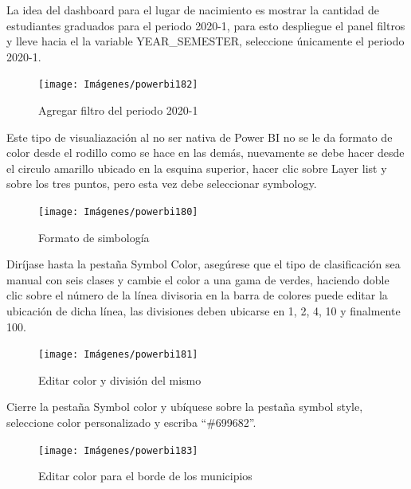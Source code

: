 \documentclass[
]{book}
\begin{document}
La idea del dashboard para el lugar de nacimiento es mostrar la cantidad de estudiantes graduados para el periodo 2020-1, para esto despliegue el panel filtros y lleve hacia el la variable YEAR\_SEMESTER, seleccione únicamente el periodo 2020-1.

\begin{figure}

{\centering \texttt{[image: Imágenes/powerbi182]} 

}

\caption{Agregar filtro del periodo 2020-1}\label{fig:mapaarcgiscoloreadofiltrodeperiodo-fig}
\end{figure}

Este tipo de visualiazación al no ser nativa de Power BI no se le da formato de color desde el rodillo como se hace en las demás, nuevamente se debe hacer desde el circulo amarillo ubicado en la esquina superior, hacer clic sobre Layer list y sobre los tres puntos, pero esta vez debe seleccionar symbology.

\begin{figure}

{\centering \texttt{[image: Imágenes/powerbi180]} 

}

\caption{Formato de simbología}\label{fig:mapaarcgiseditarsimbologia-fig}
\end{figure}

Diríjase hasta la pestaña Symbol Color, asegúrese que el tipo de clasificación sea manual con seis clases y cambie el color a una gama de verdes, haciendo doble clic sobre el número de la línea divisoria en la barra de colores puede editar la ubicación de dicha línea, las divisiones deben ubicarse en 1, 2, 4, 10 y finalmente 100.

\begin{figure}

{\centering \texttt{[image: Imágenes/powerbi181]} 

}

\caption{Editar color y división del mismo}\label{fig:mapaarcgiseditarsimbologiacolor-fig}
\end{figure}

Cierre la pestaña Symbol color y ubíquese sobre la pestaña symbol style, seleccione color personalizado y escriba ``\#699682''.

\begin{figure}

{\centering \texttt{[image: Imágenes/powerbi183]} 

}

\caption{Editar color para el borde de los municipios}\label{fig:mapaarcgiseditarsimbologiacolorborde-fig}
\end{figure}
\end{document}
